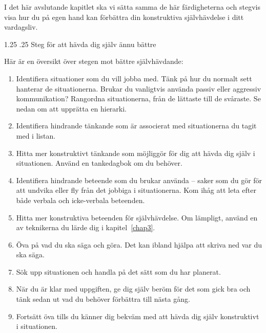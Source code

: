 \documentclass[swedish,a4paper]{book}
\makeatletter
\renewcommand\section{\@startsection{section}{1}{\z@}%
                                   {1.25\baselineskip}%
                                   {.25\baselineskip}%
                                   {\fontsize{1.25\baselineskip}{1.25\baselineskip}\selectfont\sffamily\bfseries}} %
\makeatother
\begin{document}
I det här avslutande kapitlet ska vi sätta samma de här färdigheterna och stegvis visa hur du på egen hand kan förbättra din konstruktiva självhävdelse i ditt vardagsliv.

\section{Steg för att hävda dig själv ännu bättre}

Här är en översikt över stegen mot bättre självhävdande:

\begin{enumerate}

\item Identifiera situationer som du vill jobba med. Tänk på hur du normalt sett hanterar de situationerna. Brukar du vanligtvis använda passiv eller aggressiv kommunikation? Rangordna situationerna, från de lättaste till de svåraste. Se nedan om att upprätta en hierarki.

\item Identifiera hindrande tänkande som är associerat med situationerna du tagit med i listan.

\item Hitta mer konstruktivt tänkande som möjliggör för dig att hävda dig själv i situationen. Använd en tankedagbok om du behöver.

\item Identifiera hindrande beteende som du brukar använda -- saker som du gör för att undvika eller fly från det jobbiga i situationerna. Kom ihåg att leta efter både verbala och icke-verbala beteenden.

\item Hitta mer konstruktiva beteenden för självhävdelse. Om lämpligt, använd en av teknikerna du lärde dig i kapitel~\ref{chap3}.

\item Öva på vad du ska säga och göra. Det kan ibland hjälpa att skriva ned var du ska säga.

\item Sök upp situationen och handla på det sätt som du har planerat.

\item När du är klar med uppgiften, ge dig själv beröm för det som gick bra och tänk sedan ut vad du behöver förbättra till nästa gång.

\item Fortsätt öva tills du känner dig bekväm med att hävda dig själv konstruktivt i situationen.

\end{enumerate}
\end{document}
